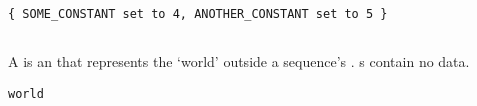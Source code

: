 \begin{lstlisting}[style=Example]
{ SOME_CONSTANT set to 4, ANOTHER_CONSTANT set to 5 }
\end{lstlisting}

\subsection{\mworld}\label{ssec:metamodel-actors-world}

A \mworld{} is an \mactor{} that represents the `world' outside a sequence's
\mtarget.  \mworld s contain no data.

\begin{lstlisting}[style=Example]
world
\end{lstlisting}

